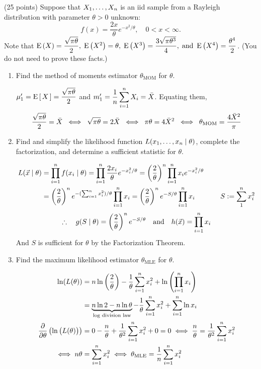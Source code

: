 (25 points) Suppose that ${X}_1, \dots, {X}_n$ is an iid sample from a Rayleigh distribution with parameter $\theta > 0$ unknown:
$$f(x) = \dfrac{2x}{\theta}e^{-x^2/\theta},\quad 0 < x < \infty.$$
Note that $\operatorname{E} \left( {X} \right) = \dfrac{\sqrt{\pi \theta}}{2},\; \operatorname{E} \left( {X^2} \right) = \theta, \; \operatorname{E} \left( {X^3} \right) = \dfrac{3\sqrt{\pi \theta^3}}{4},\; \text{and } \operatorname{E} \left( {X^4} \right) = \dfrac{\theta^4}{2}$. (You do not need to prove these facts.)
\begin{enumerate}[label=(\alph*)]
    \item Find the method of moments estimator $\theta_{\text{MOM}}$ for $\theta$.
    \begin{mybox}
        $\mu_1'= \operatorname{E} \left[ { \,{X}\, } \right] = \dfrac{\sqrt{\pi \theta}}{2}$ and $m_1' = \displaystyle \frac{1}{{n}}\sum_{i=1}^n X_i = \bar{X}$. Equating them,
            $$\dfrac{\sqrt{\pi \theta}}{2} = \bar{X} 
            \;\iff\; \sqrt{\pi \theta} = 2\bar{X} 
            \;\iff\;  \pi \theta = 4\bar{X}^2
            \;\iff\;  \theta_{\text{MOM}} = \frac{4 \bar{X}^2}{\pi}$$
    \end{mybox}
    \vspace{.2in}
    \item Find and simplify the likelihood function $L({x}_1, \dots, {x}_n \mid \theta)$, complete the factorization, and determine a sufficient statistic for $\theta$.
    \begin{mybox}
        \begin{align*}
            L(\vec{x} \mid \theta) &= \prod_{i=1}^n f(x_i \mid \theta ) = \prod_{i=1}^n \dfrac{2x_i}{\theta}e^{-x_i^2/\theta} = \left( \frac{{2}}{{\theta}} \right)^n \prod_{i=1}^n x_i e^{-x_i^2/\theta} \\
            &= \left( \frac{{2}}{{\theta}} \right)^n e^{-(\sum_{i=1}^n x_i^2 )/\theta} \prod_{i=1}^n x_i = \left( \frac{{2}}{{\theta}} \right)^n e^{-S/\theta} \prod_{i=1}^n x_i \hspace{.5in} S:=\sum_1^n x_i^2
        \end{align*} 
        $$\therefore \quad g(S \mid \theta) = \left( \frac{{2}}{{\theta}} \right)^n e^{-S/\theta} \quad \text{and} \quad h(\vec{x}) = \prod_{i=1}^n x_i$$
        And $S$ is sufficient for $\theta$ by the Factorization Theorem.
    \end{mybox}
\vspace{.2in}
    \item Find the maximum likelihood estimator $\theta_{\text{MLE}}$ for $\theta$.
    \begin{mybox}
        \begin{align*}
            \ln(L(\theta)) &= n \ln \left( \frac{{2}}{{\theta}} \right) -\frac{1}{\theta}\sum_{i=1}^n x_i^2 + \ln \left( {\prod_{i=1}^n x_i} \right) \\
            &= \underbrace{n \ln 2 - n \ln \theta}_{\text{log division law}} -\frac{1}{\theta}\sum_{i=1}^n x_i^2 + \sum_{i=1}^n \ln x_i\\
            \frac{\partial}{\partial \theta}\left( {\ln\big(L(\theta)\big)} \right) &= 0 - \frac{n}{\theta} + \frac{1}{{\theta^2}} \sum_{i=1}^n x_i^2 + 0 = 0
            \iff \frac{n}{\theta} = \frac{1}{{\theta^2}} \sum_{i=1}^n x_i^2 \\
            \iff n\theta &=  \sum_{i=1}^n x_i^2
            \iff \theta_{\text{MLE}} = \frac{1}{{n}}\sum_{i=1}^n x_i^2
        \end{align*}



\end{mybox}
\end{enumerate}

